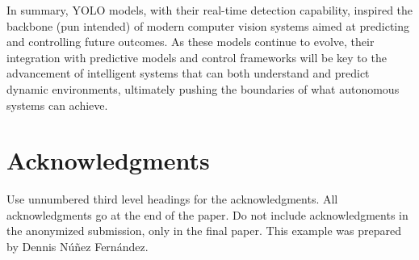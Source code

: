 \documentclass{article}
\begin{document}
In summary, YOLO models, with their real-time detection capability, inspired the backbone (pun intended) of modern computer vision systems aimed at predicting and controlling future outcomes. As these models continue to evolve, their integration with predictive models and control frameworks will be key to the advancement of intelligent systems that can both understand and predict dynamic environments, ultimately pushing the boundaries of what autonomous systems can achieve.



\section{Acknowledgments}

Use unnumbered third level headings for the acknowledgments. All acknowledgments go at the end of the paper. Do not include acknowledgments in the anonymized submission, only in the final paper. This example was prepared by Dennis Núñez Fernández.



{}

\end{document}
